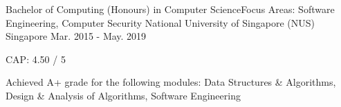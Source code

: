 

\begin{cventries}

  \cventry
    {Bachelor of Computing (Honours) in Computer Science\linebreak Focus Areas: Software Engineering, Computer Security} %
    {National University of Singapore (NUS)} %
    {Singapore} %
    {Mar. 2015 - May. 2019} %
    {
      \begin{cvitems} %
        \item {CAP: 4.50 / 5}
        \item {Achieved A+ grade for the following modules: Data Structures \& Algorithms, Design \& Analysis of Algorithms, Software Engineering}
      \end{cvitems}
    }

\end{cventries}
